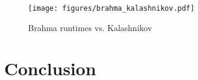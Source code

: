 \documentclass[a4paper]{llncs}
\begin{document}
\begin{figure}
 \texttt{[image: figures/brahma\_kalashnikov.pdf]}
 \label{fig:brahma-kalashnikov}
 \caption{Brahma runtimes vs. Kalashnikov}
\end{figure}


\section{Conclusion}

{}

\end{document}
